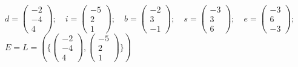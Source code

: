 \documentclass[10pt,ngerman]{scrartcl}
\begin{document}
\begin{enumerate}[1.]
	    \begin{math}d =	\begin{pmatrix}-2 \\ -4 \\ 4\end{pmatrix}\end{math}; ~ 
	    \begin{math}i =	\begin{pmatrix}-5 \\ 2 \\ 1\end{pmatrix}\end{math}; ~ 
	    \begin{math}b =	\begin{pmatrix}-2 \\ 3 \\ -1\end{pmatrix}\end{math}; ~ 
	    \begin{math}s =	\begin{pmatrix}-3 \\ 3 \\ 6\end{pmatrix}\end{math}; ~ 
	    \begin{math}e =	\begin{pmatrix}-3 \\ 6 \\ -3\end{pmatrix}\end{math}; \newline
	    \begin{math}E = L =	(\{\begin{pmatrix}-2 \\ -4 \\ 4\end{pmatrix},\begin{pmatrix}-5 \\ 2 \\ 1\end{pmatrix} \})\end{math}
	    
	    ~\newline~
	    

\end{enumerate}
\end{document}
